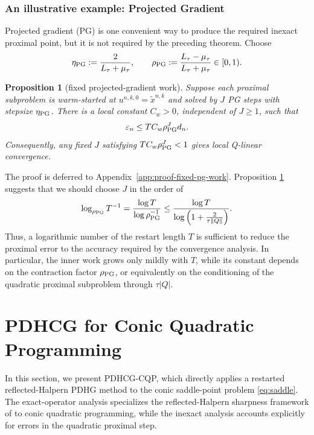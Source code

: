 \documentclass[letterpaper]{article} %
\newtheorem{proposition}[theorem]{Proposition}
\theoremstyle{definition}
\theoremstyle{remark}
\begin{document}
\subsubsection{An illustrative example: Projected Gradient}

Projected gradient (PG) is one convenient way to produce the required inexact
proximal point, but it is not required by the preceding theorem.  Choose
\begin{equation}
\label{eq:theory-pg-parameters}
    \eta_{\rm PG}
    :=
    \frac{2}{L_\tau+\mu_\tau},
    \qquad
    \rho_{\rm PG}
    :=
    \frac{L_\tau-\mu_\tau}{L_\tau+\mu_\tau}
    \in[0,1).
\end{equation}

\begin{proposition}[fixed projected-gradient work]
\label{prop:fixed-pg-work}
Suppose each proximal subproblem is warm-started at
$u^{n,k,0}=\widetilde x^{n,k}$ and solved by $J$ PG steps with stepsize
$\eta_{\rm PG}$.  There is a local constant $C_w>0$, independent of
$J\ge1$, such that
\begin{equation}
\label{eq:theory-fixed-j-error}
    \varepsilon_n
    \le
    T C_w\rho_{\rm PG}^Jd_n.
\end{equation}
Consequently, any fixed $J$ satisfying
$T C_w\rho_{\rm PG}^J<1$ gives local Q-linear convergence.
\end{proposition}

The proof is deferred to Appendix~\ref{app:proof-fixed-pg-work}. Proposition \ref{prop:fixed-pg-work} suggests that we should choose $J$ in the order of 
$$
\log_{\rho_{\rm PG}} T^{-1} = \frac{\log T}{\log \rho_{\rm PG}^{-1}} \leq \frac{\log T}{\log \left(1 + \frac{2}{\tau \|Q\|} \right)}.
$$
Thus, a logarithmic number of the restart length $T$ is sufficient to reduce the proximal error to the accuracy required by the convergence analysis. In particular, the inner work grows only mildly with $T$, while its constant depends on the contraction factor $\rho_{\rm PG}$, or equivalently on the conditioning of the quadratic proximal subproblem through $\tau|Q|$.

\else
\section{PDHCG for Conic Quadratic Programming}
\label{sec:rh-restart-theory}

In this section, we present PDHCG-CQP, which directly applies a restarted
reflected-Halpern PDHG method to the conic saddle-point problem
\eqref{eq:saddle}.  The exact-operator analysis specializes the reflected-Halpern
sharpness framework of \cite{lu2024restarted,liu2026reflected} to conic
quadratic programming, while the inexact analysis accounts explicitly for
errors in the quadratic proximal step.
\end{document}
